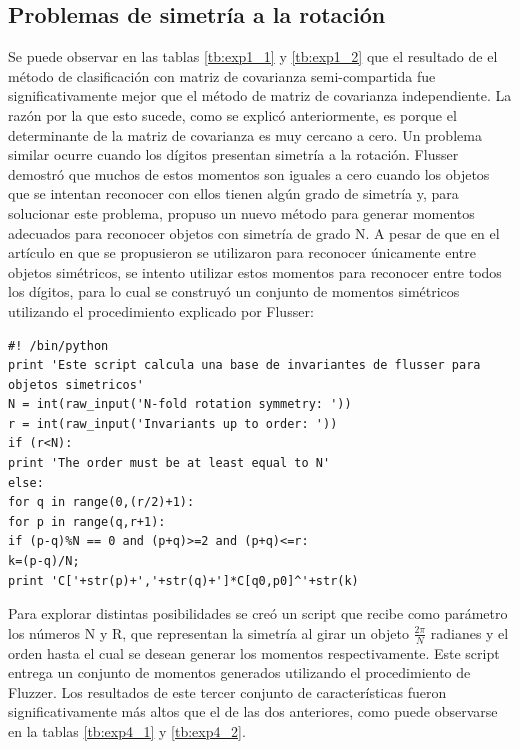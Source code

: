 \documentclass[a4paper, 11pt, oneside]{report}
\newenvironment{mylisting}
{\begin{list}{}{\setlength{\leftmargin}{1em}}\item\scriptsize\bfseries}
{\end{list}}
\begin{document}
\subsection{Problemas de simetría a la rotación}
Se puede observar en las tablas \ref{tb:exp1_1} y \ref{tb:exp1_2} que el resultado de el método de clasificación con matriz de covarianza semi-compartida fue significativamente mejor que el método de matriz de covarianza independiente. La razón por la que esto sucede, como se explicó anteriormente, es porque el determinante de la matriz de covarianza es muy cercano a cero. Un problema similar ocurre cuando los dígitos presentan simetría a la rotación. Flusser\cite{flusser06} demostró que muchos de estos momentos son iguales a cero cuando los objetos que se intentan reconocer con ellos tienen algún grado de simetría y, para solucionar este problema, propuso un nuevo método para generar momentos adecuados para reconocer objetos con simetría de grado N. A pesar de que en el artículo en que se propusieron se utilizaron para reconocer únicamente entre objetos simétricos, se intento utilizar estos momentos para reconocer entre todos los dígitos, para lo cual se construyó un conjunto de momentos simétricos utilizando el procedimiento explicado por Flusser:
\begin{mylisting}
\begin{verbatim}
#! /bin/python
print 'Este script calcula una base de invariantes de flusser para objetos simetricos'
N = int(raw_input('N-fold rotation symmetry: '))
r = int(raw_input('Invariants up to order: '))
if (r<N):
print 'The order must be at least equal to N'
else:
for q in range(0,(r/2)+1):
for p in range(q,r+1):
if (p-q)%N == 0 and (p+q)>=2 and (p+q)<=r:
k=(p-q)/N;
print 'C['+str(p)+','+str(q)+']*C[q0,p0]^'+str(k) 
\end{verbatim}
\end{mylisting}
Para explorar distintas posibilidades se creó un script que recibe como parámetro los números N y R, que representan la simetría al girar un objeto $\frac{2\pi}{N}$ radianes y el orden hasta el cual se desean generar los momentos respectivamente. Este script entrega un conjunto de momentos generados utilizando el procedimiento de Fluzzer. Los resultados de este tercer conjunto de características fueron significativamente más altos que el de las dos anteriores, como puede observarse en la tablas \ref{tb:exp4_1} y \ref{tb:exp4_2}.
\end{document}
